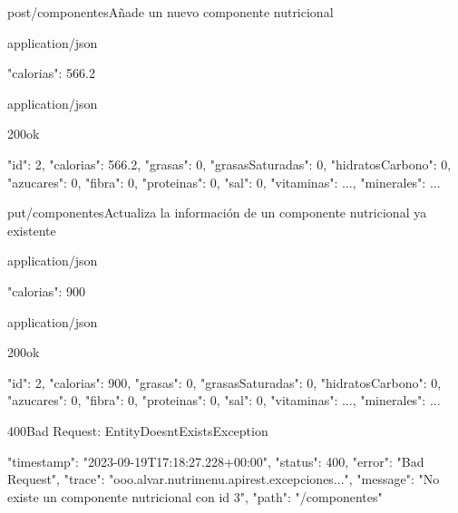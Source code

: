 \begin{apiRoute}{post}{/componentes}{Añade un nuevo componente nutricional}
	\begin{routeRequest}{application/json}
		\begin{routeRequestBody}
{
    "calorias": 566.2
}
		\end{routeRequestBody}
	\end{routeRequest}
	\begin{routeResponse}{application/json}
		\begin{routeResponseItem}{200}{ok}
			\begin{routeResponseItemBody}
{
    "id": 2,
    "calorias": 566.2,
    "grasas": 0,
    "grasasSaturadas": 0,
    "hidratosCarbono": 0,
    "azucares": 0,
    "fibra": 0,
    "proteinas": 0,
    "sal": 0,
    "vitaminas": 
    	{...},
    "minerales": 
    	{...}
}
			\end{routeResponseItemBody}
		\end{routeResponseItem}
	\end{routeResponse}
\end{apiRoute}

\begin{apiRoute}{put}{/componentes}{Actualiza la información de un componente nutricional ya existente}
	\begin{routeParameter}
	\end{routeParameter}
	
	\begin{routeRequest}{application/json}
		\begin{routeRequestBody}
{
	"calorias": 900
}
		\end{routeRequestBody}
	\end{routeRequest}
	\begin{routeResponse}{application/json}
		\begin{routeResponseItem}{200}{ok}
			\begin{routeResponseItemBody}
{
    "id": 2,
    "calorias": 900,
    "grasas": 0,
    "grasasSaturadas": 0,
    "hidratosCarbono": 0,
    "azucares": 0,
    "fibra": 0,
    "proteinas": 0,
    "sal": 0,
    "vitaminas": 
    	{...},
    "minerales": 
    	{...}
}
			\end{routeResponseItemBody}
		\end{routeResponseItem}
		\begin{routeResponseItem}{400}{Bad Request: EntityDoesntExistsException}
			\begin{routeResponseItemBody}
{
    "timestamp": "2023-09-19T17:18:27.228+00:00",
    "status": 400,
    "error": "Bad Request",
    "trace": "ooo.alvar.nutrimenu.apirest.excepciones...",
    "message": "No existe un componente nutricional con id 3",
    "path": "/componentes"
}
			\end{routeResponseItemBody}
		\end{routeResponseItem}
	\end{routeResponse}
\end{apiRoute}

